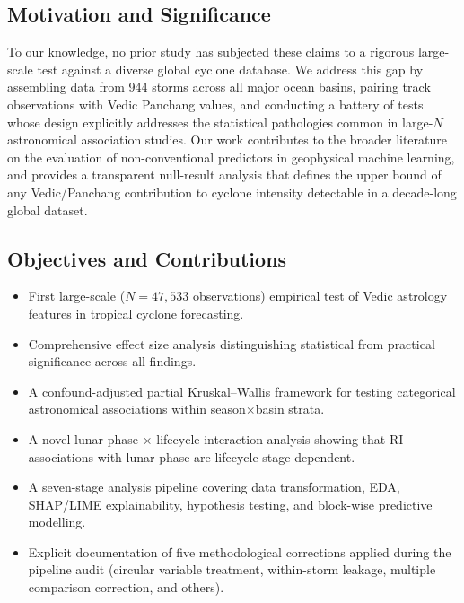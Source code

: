 \documentclass[12pt,a4paper]{article}
\begin{document}
    \subsection{Motivation and Significance}

    To our knowledge, no prior study has subjected these claims to a rigorous
    large-scale test against a diverse global cyclone database. We address this
    gap by assembling data from 944 storms across all major ocean basins, pairing
    track observations with Vedic Panchang values, and conducting a battery of
    tests whose design explicitly addresses the statistical pathologies common in
    large-$N$ astronomical association studies. Our work contributes to the
    broader literature on the evaluation of non-conventional predictors in
    geophysical machine learning, and provides a transparent null-result analysis
    that defines the upper bound of any Vedic/Panchang contribution to cyclone
    intensity detectable in a decade-long global dataset.

    \subsection{Objectives and Contributions}

    \begin{itemize}[noitemsep]
    \item First large-scale ($N = 47{,}533$ observations) empirical test of Vedic
            astrology features in tropical cyclone forecasting.
    \item Comprehensive effect size analysis distinguishing statistical from
            practical significance across all findings.
    \item A confound-adjusted partial Kruskal--Wallis framework for testing
            categorical astronomical associations within season$\times$basin strata.
    \item A novel lunar-phase $\times$ lifecycle interaction analysis showing that
            RI associations with lunar phase are lifecycle-stage dependent.
    \item A seven-stage analysis pipeline covering data transformation, EDA,
            SHAP/LIME explainability, hypothesis testing, and block-wise predictive
            modelling.
    \item Explicit documentation of five methodological corrections applied during
            the pipeline audit (circular variable treatment, within-storm leakage,
            multiple comparison correction, and others).
    \end{itemize}
\end{document}
